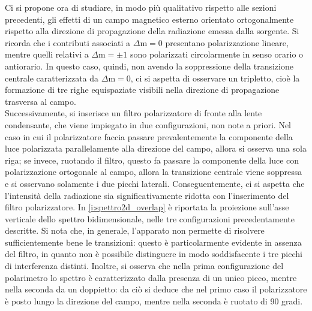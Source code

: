 \documentclass[twocolumn,10pt]{asme2ej}
\begin{document}
Ci si propone ora di studiare, in modo più qualitativo rispetto alle sezioni precedenti, gli effetti di un campo
magnetico esterno orientato ortogonalmente rispetto alla direzione di propagazione della radiazione emessa dalla
sorgente. Si  ricorda che i contributi associati a $\Delta \text{m} = 0$ presentano polarizzazione lineare, mentre
quelli relativi a $\Delta \text{m} = \pm 1$ sono polarizzati circolarmente in senso orario o antiorario. In questo caso,
quindi, non avendo la soppressione della transizione centrale caratterizzata da $\Delta \text{m} = 0$, ci si aspetta di
osservare un tripletto, cioè la formazione di tre righe equispaziate visibili nella direzione di propagazione trasversa
al campo. \\
Successivamente, si inserisce un filtro polarizzatore di fronte alla lente condensante, che viene impiegato in due
configurazioni, non note a priori. Nel caso in cui il polarizzatore faccia passare prevalentemente la componente della
luce polarizzata parallelamente alla direzione del campo, allora si osserva una sola riga; se invece, ruotando il
filtro, questo fa passare la componente della luce con polarizzazione ortogonale al campo, allora la transizione
centrale viene soppressa e si osservano solamente i due picchi laterali. Conseguentemente, ci si aspetta che l'intensità
della radiazione sia significativamente ridotta con l'inserimento del filtro polarizzatore.  
In \autoref{i:spettro2d_overlap} è riportata la proiezione sull'asse verticale dello spettro bidimensionale, nelle tre
configurazioni precedentamente descritte. Si nota che, in generale, l'apparato non permette di risolvere
sufficientemente bene le transizioni: questo è particolarmente evidente in assenza del filtro, in quanto non è possibile
distinguere in modo soddisfacente i tre picchi di interferenza distinti. Inoltre, si osserva che nella prima
configurazione del polarimetro lo spettro è caratterizzato dalla presenza di un unico picco, mentre nella seconda da un
doppietto: da ciò si deduce che nel primo caso il polarizzatore è posto lungo la direzione del campo, mentre nella
seconda è ruotato di 90 gradi. 
\end{document}
